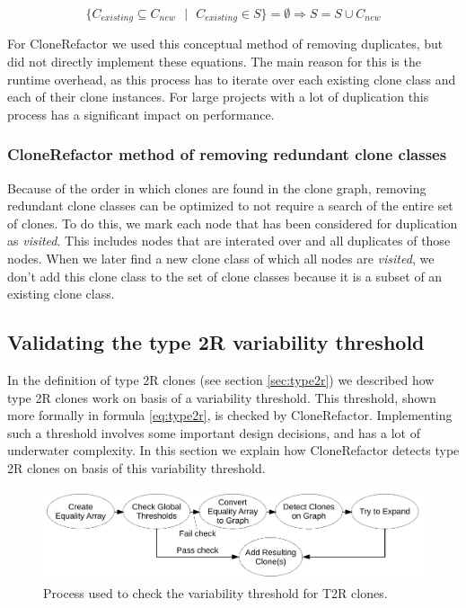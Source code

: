 \begin{equation}\label{eq:removeexisting}
\{C_{existing} \subseteq C_{new}\text{ }|\text{ }C_{existing} \in S\} = \emptyset \Rightarrow S = S \cup C_{new}
\end{equation}

For CloneRefactor we used this conceptual method of removing duplicates, but did not directly implement these equations. The main reason for this is the runtime overhead, as this process has to iterate over each existing clone class and each of their clone instances. For large projects with a lot of duplication this process has a significant impact on performance.

\subsubsection{CloneRefactor method of removing redundant clone classes}
Because of the order in which clones are found in the clone graph, removing redundant clone classes can be optimized to not require a search of the entire set of clones. To do this, we mark each node that has been considered for duplication as \textit{visited}. This includes nodes that are interated over and all duplicates of those nodes. When we later find a new clone class of which all nodes are \textit{visited}, we don't add this clone class to the set of clone classes because it is a subset of an existing clone class.



\subsection{Validating the type 2R variability threshold}
In the definition of type 2R clones (see section \ref{sec:type2r}) we described how type 2R clones work on basis of a variability threshold. This threshold, shown more formally in formula \ref{eq:type2r}, is checked by CloneRefactor. Implementing such a threshold involves some important design decisions, and has a lot of underwater complexity. In this section we explain how CloneRefactor detects type 2R clones on basis of this variability threshold.

\begin{figure}[H]
  \centering
  \includegraphics[width=1\columnwidth]{img/CloneRefactorT2RFlow}
  \caption{Process used to check the variability threshold for T2R clones.}
  \label{fig:clonerefactort2rflow}
\end{figure}

